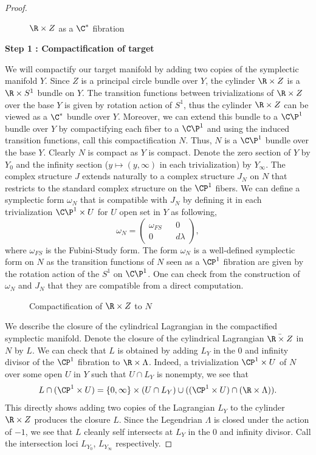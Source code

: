 \begin{proof}

\begin{figure}[ht]
    \centering
    \caption{$\R \times Z$ as a $\C^*$ fibration}
    \label{fig:cylfib}
\end{figure}

\textbf{Step 1 : Compactification of target} 

We will compactify our target manifold by adding two copies of the symplectic manifold $Y$. Since $Z$ is a principal circle bundle over $Y$, the cylinder $\R \times Z$ is a $\R \times S^1 $ bundle on $Y$. The transition functions  between trivializations of $\R \times Z$ over the base $Y$ is given by rotation action of $S^1$, thus the cylinder $\R \times Z$ can be viewed as a $\C^*$ bundle over $Y$. Moreover, we can extend this bundle to a $\C\P^1$ bundle over $Y$ by compactifying each fiber to a $\C\P^1$ and using the induced transition functions, call this compactification $N$. Thus, $N$ is a $\C\P^1$ bundle over the base $Y$. Clearly $N$ is compact as $Y$ is compact. Denote the zero section of $Y$  by $Y_0$ and the infinity section ($y\mapsto (y,\infty)$ in each trivialization) by $Y_\infty$.  The complex structure $J$ extends naturally to a complex structure $J_N$ on $N$ that restricts to the standard complex structure on the $\CP^1$ fibers. We can define a symplectic form $\omega_N$ that is compatible with $J_N$ by defining it in each trivialization $\C\P^1 \times U$ for $U$ open set in $Y$ as following, 
$$\omega_N =  \left( \begin{matrix} \omega_{FS} && 0 \\ 0 && d\lambda  \end{matrix} \right) ,$$
where $\omega_{FS}$ is the Fubini-Study form. The form $\omega_N$ is a well-defined symplectic form on $N$ as the transition functions of $N$ seen as a  $\CP^1$ fibration are given by the rotation action of the $S^1$ on $\C\P^1$. One can check from the construction of $\omega_N$ and $J_N$ that they are compatible from a direct computation.

\begin{figure}[ht]
    \centering
    \caption{Compactification of $\R \times Z$ to $N$}
    \label{fig:compcyl}
\end{figure}


We describe the closure of the cylindrical Lagrangian in the compactified symplectic manifold. Denote the closure of the cylindrical Lagrangian $  \bar {\R \times Z}$ in $N$ by $L$. We can check that $L$ is obtained by adding $L_Y$ in the 0 and infinity divisor of the $\CP^1$ fibration to $\R \times \Lambda$. Indeed, a trivialization $\CP^1 \times  U$ of $N$ over some open $U$ in $Y$ such that $U\cap L_Y$ is nonempty, we see that $$L \cap ( \CP^1 \times  U) = \{0,\infty\}\times (U\cap L_Y)  \cup ( ( \CP^1 \times U) \cap ({\R \times \Lambda})).  $$  
This directly shows adding two copies of the Lagrangian $L_Y$ to the cylinder $\R\times Z$ produces the closure $L$. Since the Legendrian $\Lambda$ is closed under the action of $-1$, we see that $L$ cleanly self intersects at $L_Y$ in the 0 and infinity divisor. Call the intersection loci $L_{Y_0}$, $L_{Y_\infty}$ respectively.


\end{proof}
